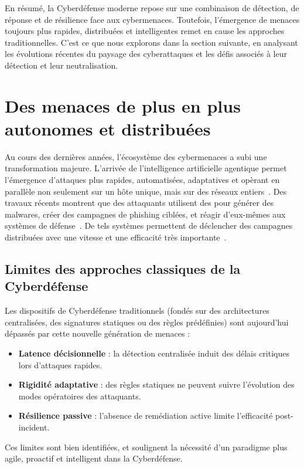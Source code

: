 \noindent
En résumé, la Cyberdéfense moderne repose sur une combinaison de détection, de réponse et de résilience face aux cybermenaces. Toutefois, l'émergence de menaces toujours plus rapides, distribuées et intelligentes remet en cause les approches traditionnelles. C'est ce que nous explorons dans la section suivante, en analysant les évolutions récentes du paysage des cyberattaques et les défis associés à leur détection et leur neutralisation.


\section{Des menaces de plus en plus autonomes et distribuées}\label{sec:evolution-menaces}

Au cours des dernières années, l'écosystème des cybermenaces a subi une transformation majeure. L'arrivée de l'intelligence artificielle agentique permet l'émergence d'attaques plus rapides, automatisées, adaptatives et opèrant en parallèle non seulement sur un hôte unique, mais sur des réseaux entiers~\cite{Cohen2020}. Des travaux récents montrent que des attaquants utilisent des  pour générer des malwares, créer des campagnes de phishing ciblées, et réagir d'eux-mêmes aux systèmes de défense~\cite{AutoAttacker2024}. De tels systèmes permettent de déclencher des campagnes distribuées avec une vitesse et une efficacité très importante~\cite{AgenticAIThreats2025}.

\subsection*{Limites des approches classiques de la Cyberdéfense}

Les dispositifs de Cyberdéfense traditionnels (fondés sur des architectures centralisées, des signatures statiques ou des règles prédéfinies) sont aujourd'hui dépassés par cette nouvelle génération de menaces :
\begin{itemize}
    \item \textbf{Latence décisionnelle} : la détection centralisée induit des délais critiques lors d'attaques rapides.
    \item \textbf{Rigidité adaptative} : des règles statiques ne peuvent suivre l'évolution des modes opératoires des attaquants.
    \item \textbf{Résilience passive} : l'absence de remédiation active limite l'efficacité post-incident.
\end{itemize}
Ces limites sont bien identifiées, et soulignent la nécessité d'un paradigme plus agile, proactif et intelligent dans la Cyberdéfense.

